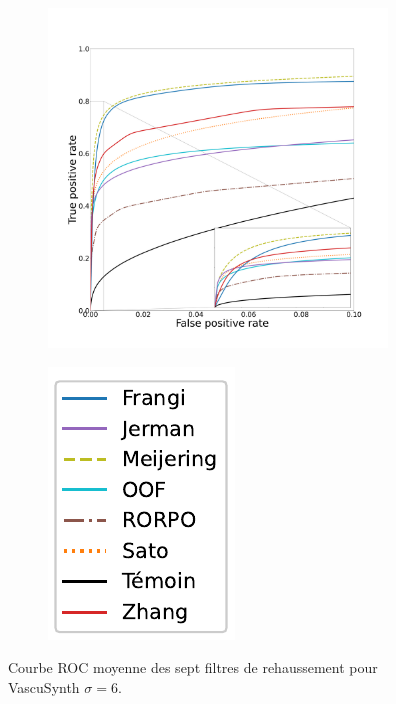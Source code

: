 \begin{figure}[!ht]
  \begin{subfigure}[t]{0.78\textwidth}
    \centering
    \includegraphics[clip = true, trim  =  125 125 100 200, height=9cm]{Images/Vascu_6_ROC.pdf}
\end{subfigure}
\begin{subfigure}[t]{0.2\textwidth}
  \includegraphics[width=\textwidth,clip = true]{Images/standAloneLegend.pdf}
\end{subfigure}
\caption{Courbe ROC moyenne des sept filtres de rehaussement pour VascuSynth $\sigma=6$.}
  \label{fig:Vascu6_ROC}
\end{figure}

